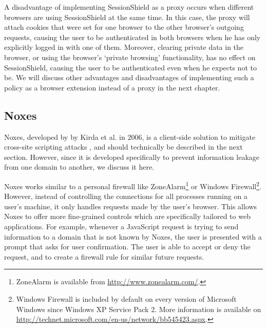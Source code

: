 A disadvantage of implementing SessionShield as a proxy occurs when different browsers are using SessionShield at the same time. In this case, the proxy will attach cookies that were set for one browser to the other browser's outgoing requests, causing the user to be authenticated in both browsers when he has only explicitly logged in with one of them. Moreover, clearing private data in the browser, or using the browser's `private browsing' functionality, has no effect on SessionShield, causing the user to be authenticated even when he expects not to be. We will discuss other advantages and disadvantages of implementing such a policy as a browser extension instead of a proxy in the next chapter.

\subsection{Noxes}\label{noxes}

Noxes, developed by by Kirda et al. in 2006, is a client-side solution to mitigate cross-site scripting attacks \cite{Kirda2006}, and should technically be described in the next section. However, since it is developed specifically to prevent information leakage from one domain to another, we discuss it here.

Noxes works similar to a personal firewall like ZoneAlarm\footnote{ZoneAlarm is available from \url{http://www.zonealarm.com/}.} or Windows Firewall\footnote{Windows Firewall is included by default on every version of Microsoft Windows since Windows XP Service Pack 2. More information is available on \url{http://technet.microsoft.com/en-us/network/bb545423.aspx}.}. However, instead of controlling the connections for all processes running on a user's machine, it only handles requests made by the user's browser. This allows Noxes to offer more fine-grained controls which are specifically tailored to web applications. For example, whenever a JavaScript request is trying to send information to a domain that is not known by Noxes, the user is presented with a prompt that asks for user confirmation. The user is able to accept or deny the request, and to create a firewall rule for similar future requests.

